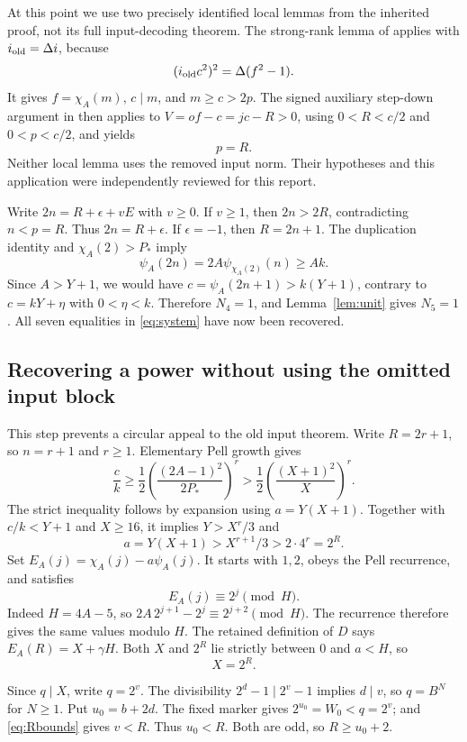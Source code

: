 \documentclass[11pt]{article}
\theoremstyle{remark}\newtheorem{remark}[theorem]{Remark}
\begin{document}
At this point we use two precisely identified local lemmas from the
inherited proof, not its full input-decoding theorem. The strong-rank
lemma of \cite{Relaxed} applies with $i_{\rm old}=\Delta i$, because
\[
 (i_{\rm old}c^2)^2=\Delta(f^2-1).
\]
It gives $f=\chi_A(m)$, $c\mid m$, and $m\ge c>2p$.
The signed auxiliary step-down argument in \cite[Section 4]{Reverse89}
then applies to $V=of-c=jc-R>0$, using
$0<R<c/2$ and $0<p<c/2$, and yields
\begin{equation}\label{eq:pR}p=R.\end{equation}
Neither local lemma uses the removed input norm. Their hypotheses
and this application were independently reviewed for this report.

Write $2n=R+\epsilon+vE$ with $v\ge0$. If $v\ge1$, then
$2n>2R$, contradicting $n<p=R$. Thus $2n=R+\epsilon$.
If $\epsilon=-1$, then $R=2n+1$. The duplication identity and
$\chi_A(2)>P_*$ imply
\[
 \psi_A(2n)=2A\psi_{\chi_A(2)}(n)\ge A k.
\]
Since $A>Y+1$, we would have $c=\psi_A(2n+1)>k(Y+1)$,
contrary to $c=kY+\eta$ with $0<\eta<k$.
Therefore $N_4=1$, and Lemma~\ref{lem:unit} gives $N_5=1$.
All seven equalities in \eqref{eq:system} have now been recovered.

\subsection{Recovering a power without using the omitted input block}

This step prevents a circular appeal to the old input theorem.
Write $R=2r+1$, so $n=r+1$ and $r\ge1$.
Elementary Pell growth gives
\[
 \frac ck\ge\frac12
 \left(\frac{(2A-1)^2}{2P_*}\right)^r
 >\frac12\left(\frac{(X+1)^2}{X}\right)^r.
\]
The strict inequality follows by expansion using $a=Y(X+1)$.
Together with $c/k<Y+1$ and $X\ge16$, it implies
$Y>X^r/3$ and
\[
 a=Y(X+1)>X^{r+1}/3>2\cdot4^r=2^R.
\]
Set $E_A(j)=\chi_A(j)-a\psi_A(j)$. It starts with $1,2$,
obeys the Pell recurrence, and satisfies
\begin{equation}\label{eq:powercong}
 E_A(j)\equiv2^j\pmod H.
\end{equation}
Indeed $H=4A-5$, so $2A\,2^{j+1}-2^j\equiv2^{j+2}\pmod H$.
The recurrence therefore gives the same values modulo $H$.
The retained definition of $D$ says $E_A(R)=X+\gamma H$.
Both $X$ and $2^R$ lie strictly between $0$ and $a<H$, so
\begin{equation}\label{eq:Xpower}X=2^R.\end{equation}

Since $q\mid X$, write $q=2^v$. The divisibility
$2^d-1\mid2^v-1$ implies $d\mid v$, so $q=B^N$ for $N\ge1$.
Put $u_0=b+2d$. The fixed marker gives
$2^{u_0}=W_0<q=2^v$; and \eqref{eq:Rbounds} gives $v<R$.
Thus $u_0<R$. Both are odd, so $R\ge u_0+2$.
\end{document}
